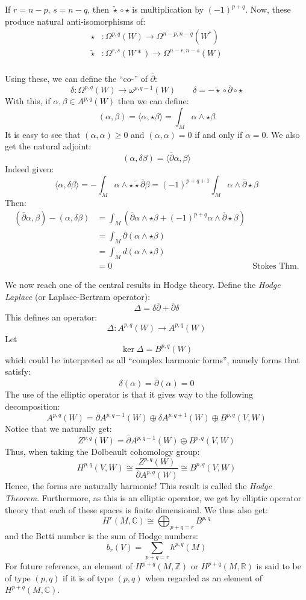 \documentclass{book}
\newcommand{\C}{{\mathbb{C}}}
\newcommand{\R}{{\mathbb{R}}}
\newcommand{\Z}{{\mathbb{Z}}}
\begin{document}
If $r = n-p$, $s = n-q$, then $\widetilde{\star}\circ \star$ is multiplication by $(-1)^{p+q}$. Now, these
produce natural anti-isomorphisms of:
\begin{align*}
  \star&: \Omega^{p,q}(W) \to \Omega^{n-p, n-q}(W^*)\\
  \widetilde{\star}&: \Omega^{r,s}(W*) \to \Omega^{n-r, n-s}(W)\\
\end{align*}

Using these, we can define the ``co-'' of $\overline{\partial}$:
\[
  \delta: \Omega^{p,q}(W) \to \omega^{p, q-1}(W) \qquad \delta= -\widetilde{\star} \circ
  \overline{\partial} \circ \star
\]
With this, if $\alpha,\beta \in A^{p,q}(W)$ then we can define:
\[
  \left( \alpha,\beta \right) = \langle \alpha, \star \beta \rangle = \int_M \alpha \wedge  \star \beta
\]
It is easy to see that $\left( \alpha,\alpha \right) \ge 0$ and $\left(\alpha,\alpha  \right) = 0$ if and only
if $\alpha = 0$. We also get the natural adjoint:
\[
  \left(\alpha, \delta \beta\right) = \langle \overline{\partial}\alpha, \beta \rangle
\]
Indeed given:
\[
  \langle\alpha, \delta \beta\rangle = - \int_M \alpha \wedge  \star \widetilde{\star}\overline{\partial} \beta = (-1)^{p+q+1} \int_M \alpha \wedge \overline{\partial} \star \beta
\]
Then:
\begin{align*}
    (\overline{\partial}\alpha, \beta) - (\alpha, \delta \beta) &= \int_M (\overline{\partial}\alpha \wedge \star \beta + (-1)^{p+q} \alpha \wedge \overline{\partial} \star \beta) \\
    &= \int_M \overline{\partial}(\alpha \wedge \star \beta) \\
    &= \int_M d(\alpha \wedge \star \beta) \\
    &= 0 & \text{Stokes Thm.}
\end{align*}


We now reach one of the central results in Hodge theory. Define the \emph{Hodge Laplace} (or Laplace-Bertram
operator):
\[
  \Delta = \delta\overline{\partial} + \overline{\partial}\delta
\]
This defines an operator:
\[
  \Delta: A^{p,q}(W) \to A^{p,q}(W)
\]
Let
\[
  \ker\Delta = B^{p,q}(W)
\]
which could be interpreted as all ``complex harmonic forms'', namely forms that satisfy:
\[
  \delta(\alpha) = \overline{\partial}(\alpha) = 0
\]
The use of the elliptic operator is that it gives way to the following decomposition:
\[
  A^{p,q}(W) = \overline{\partial}A^{p, q-1}(W) \oplus \delta A^{p, q+1}(W) \oplus B^{p,q}(V,W)
\]
Notice that we naturally get:
\[
  Z^{p,q}(W) = \overline{\partial}A^{p, q-1}(W) \oplus B^{p,q}(V,W)
\]
Thus, when taking the Dolbeault cohomology group:
\[
  H^{p,q}(V,W) \cong \frac{Z^{p,q}(W)}{\overline{\partial}A^{p,q}(W)} \cong B^{p,q}(V,W)
\]
Hence, the forms are naturally harmonic! This result is called the \emph{Hodge Theorem}. Furthermore, as this
is an elliptic operator, we get by elliptic operator theory that each of these spaces is finite dimensional.
We thus also get:
\[
  H^r(M, \C) \cong \bigoplus_{p+q=r} B^{p,q}
\]
and the Betti number is the sum of Hodge numbers:
\[
  b_r(V) = \sum_{p+q=r} h^{p,q}(M)
\]
For future reference, an element of $H^{p+q}(M, \Z)$ or  $H^{p+q}(M, \R)$ is said to be of type $(p,q)$ if it
is of type $(p,q)$ when regarded as an element of $H^{p+q}(M, \C)$.
\end{document}
